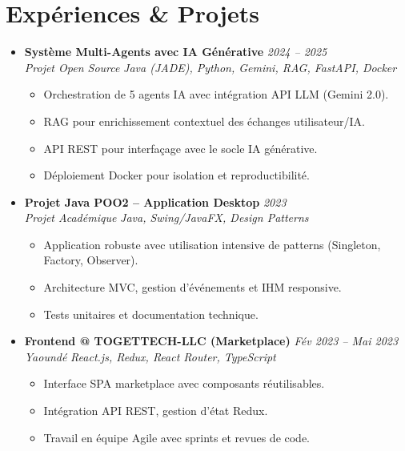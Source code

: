 \documentclass[a4paper,11pt]{article}
\begin{document}
\section{Expériences \& Projets}
\begin{itemize}[leftmargin=*, label={-}]

\item \textbf{Système Multi-Agents avec IA Générative} \hfill \textit{2024 -- 2025} \\
\textit{Projet Open Source} \hfill \textit{Java (JADE), Python, Gemini, RAG, FastAPI, Docker}
\vspace{-2pt}
    \begin{itemize}[leftmargin=0.4cm, nosep, label=\tiny$\bullet$]
        \item \small{Orchestration de 5 agents IA avec intégration API LLM (Gemini 2.0).}
        \item \small{RAG pour enrichissement contextuel des échanges utilisateur/IA.}
        \item \small{API REST pour interfaçage avec le socle IA générative.}
        \item \small{Déploiement Docker pour isolation et reproductibilité.}
    \end{itemize}
\vspace{3pt}

\item \textbf{Projet Java POO2 -- Application Desktop} \hfill \textit{2023} \\
\textit{Projet Académique} \hfill \textit{Java, Swing/JavaFX, Design Patterns}
\vspace{-2pt}
    \begin{itemize}[leftmargin=0.4cm, nosep, label=\tiny$\bullet$]
        \item \small{Application robuste avec utilisation intensive de patterns (Singleton, Factory, Observer).}
        \item \small{Architecture MVC, gestion d'événements et IHM responsive.}
        \item \small{Tests unitaires et documentation technique.}
    \end{itemize}
\vspace{3pt}

\item \textbf{Frontend @ TOGETTECH-LLC (Marketplace)} \hfill \textit{Fév 2023 -- Mai 2023} \\
\textit{Yaoundé} \hfill \textit{React.js, Redux, React Router, TypeScript}
\vspace{-2pt}
    \begin{itemize}[leftmargin=0.4cm, nosep, label=\tiny$\bullet$]
        \item \small{Interface SPA marketplace avec composants réutilisables.}
        \item \small{Intégration API REST, gestion d'état Redux.}
        \item \small{Travail en équipe Agile avec sprints et revues de code.}
    \end{itemize}
\vspace{3pt}


\end{itemize}
\end{document}
